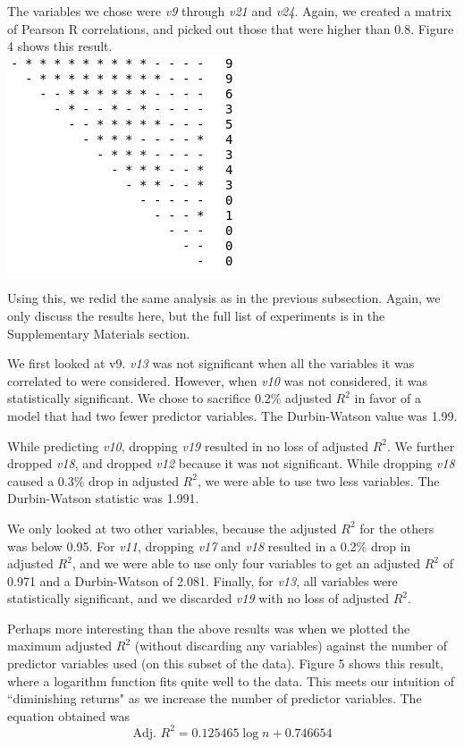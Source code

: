 \documentclass[smallextended]{svjour3}
\begin{document}
	The variables we chose were \textit{v9} through \textit{v21} and \textit{v24}. Again, we created a matrix of Pearson R correlations, and picked out those that were higher than 0.8. Figure 4 shows this result. \\
	
	\includegraphics[scale=0.6]{fig4.png}
	\begingroup
	\endgroup
	\hfill\break
	
	Using this, we redid the same analysis as in the previous subsection. Again, we only discuss the results here, but the full list of experiments is in the Supplementary Materials section.
	
	We first looked at v9. \textit{v13} was not significant when all the variables it was correlated to were considered. However, when \textit{v10} was not considered, it was statistically significant. We chose to sacrifice 0.2\% adjusted $R^2$ in favor of a model that had two fewer predictor variables. The Durbin-Watson value was 1.99.
	
	While predicting \textit{v10}, dropping \textit{v19} resulted in no loss of adjusted $R^2$. We further dropped \textit{v18}, and dropped \textit{v12} because it was not significant. While dropping \textit{v18} caused a 0.3\% drop in adjusted $R^2$, we were able to use two less variables. The Durbin-Watson statistic was 1.991.
	
	We only looked at two other variables, because the adjusted $R^2$ for the others was below 0.95. For \textit{v11}, dropping \textit{v17} and \textit{v18} resulted in a 0.2\% drop in adjusted $R^2$, and we were able to use only four variables to get an adjusted $R^2$ of 0.971 and a Durbin-Watson of 2.081. Finally, for \textit{v13}, all variables were statistically significant, and we discarded \textit{v19} with no loss of adjusted $R^2$.
	
	Perhaps more interesting than the above results was when we plotted the maximum adjusted $R^2$ (without discarding any variables) against the number of predictor variables used (on this subset of the data). Figure 5 shows this result, where a logarithm function fits quite well to the data. This meets our intuition of ``diminishing returns" as we increase the number of predictor variables. The equation obtained was
	\begin{equation}
	\text{Adj. } R^2 = 0.125465 \log n + 0.746654
	\end{equation}
	
\end{document}
